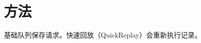 \documentclass{article}
\begin{document}
\section{方法}
基础队列保存请求。快速回放（QuickReplay）会重新执行记录。

\end{document}
